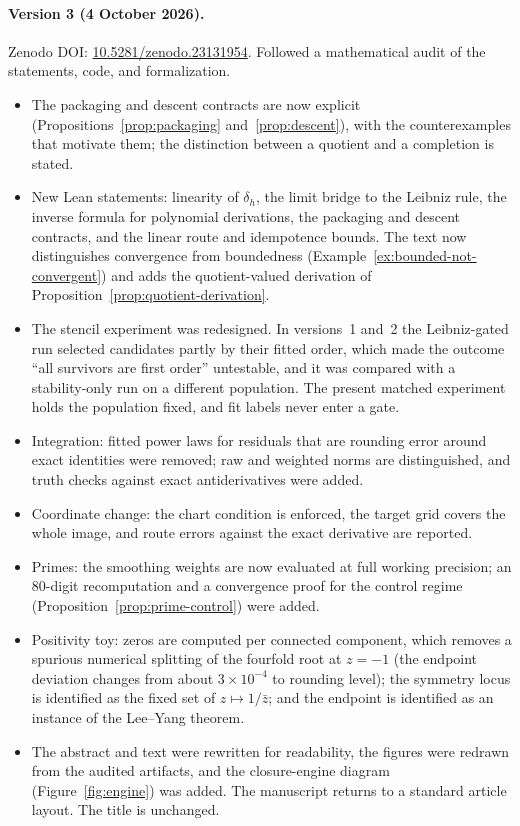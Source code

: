 \paragraph{Version 3 (4 October 2026).}
Zenodo DOI: \href{https://doi.org/10.5281/zenodo.23131954}{10.5281/zenodo.23131954}.
Followed a mathematical audit of the statements, code, and formalization.
\begin{itemize}
  \item The packaging and descent contracts are now explicit (Propositions~\ref{prop:packaging} and~\ref{prop:descent}), with the counterexamples that motivate them; the distinction between a quotient and a completion is stated.
  \item New Lean statements: linearity of $\delta_h$, the limit bridge to the Leibniz rule, the inverse formula for polynomial derivations, the packaging and descent contracts, and the linear route and idempotence bounds. The text now distinguishes convergence from boundedness (Example~\ref{ex:bounded-not-convergent}) and adds the quotient-valued derivation of Proposition~\ref{prop:quotient-derivation}.
  \item The stencil experiment was redesigned. In versions~1 and~2 the Leibniz-gated run selected candidates partly by their fitted order, which made the outcome ``all survivors are first order'' untestable, and it was compared with a stability-only run on a different population. The present matched experiment holds the population fixed, and fit labels never enter a gate.
  \item Integration: fitted power laws for residuals that are rounding error around exact identities were removed; raw and weighted norms are distinguished, and truth checks against exact antiderivatives were added.
  \item Coordinate change: the chart condition is enforced, the target grid covers the whole image, and route errors against the exact derivative are reported.
  \item Primes: the smoothing weights are now evaluated at full working precision; an $80$-digit recomputation and a convergence proof for the control regime (Proposition~\ref{prop:prime-control}) were added.
  \item Positivity toy: zeros are computed per connected component, which removes a spurious numerical splitting of the fourfold root at $z=-1$ (the endpoint deviation changes from about $3\times 10^{-4}$ to rounding level); the symmetry locus is identified as the fixed set of $z\mapsto 1/\bar z$; and the endpoint is identified as an instance of the Lee--Yang theorem.
  \item The abstract and text were rewritten for readability, the figures were redrawn from the audited artifacts, and the closure-engine diagram (Figure~\ref{fig:engine}) was added. The manuscript returns to a standard article layout. The title is unchanged.
\end{itemize}
